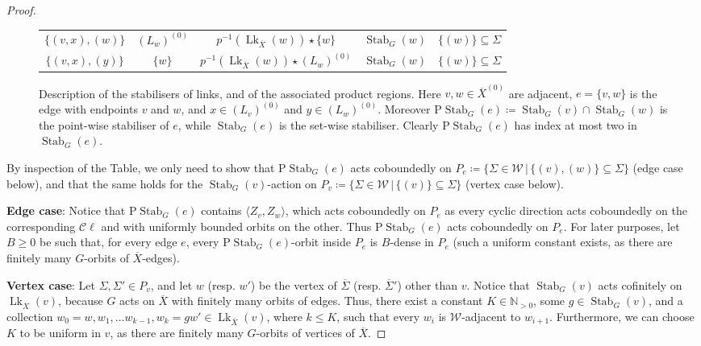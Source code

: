 \documentclass[svgnames]{amsart}
\theoremstyle{plain}
\theoremstyle{definition}
\newcommand{\C}{\mathcal C}
\newcommand{\ov}[1]{\overline{#1}}
\newcommand{\link}{\operatorname{Lk}}
\newcommand{\Stab}[2]{\operatorname{Stab}_{#1}(#2)}
\newcommand{\W}{\mathcal{W}}
\begin{document}
\begin{proof}
\begin{figure}[htp]
{\begin{tabular}{c|c|c|c|c}
        $\{(v,x),(w)\}$&  $(L_w)^{(0)}$ & $p^{-1}(\link_{\ov X}(w))\star \{w\}$ & $\Stab{G}{w}$ & $\{(w)\}\subseteq \Sigma $ \\
        $\{(v,x),(y)\}$&  $\{w\}$ & $p^{-1}(\link_{\ov X}(w))\star (L_w)^{(0)}$ &  $\Stab{G}{w}$ & $\{(w)\}\subseteq \Sigma $ 
    \end{tabular}}
    \caption{Description of the stabilisers of links, and of the associated product regions. Here $v,w\in\ov{X}^{(0)}$ are adjacent, $e=\{v,w\}$ is the edge with endpoints $v$ and $w$, and $x\in (L_v)^{(0)}$ and $y\in (L_w)^{(0)}$. Moreover $\text{P}\Stab{G}{e}\coloneq \Stab{G}{v}\cap\Stab{G}{w}$ is the point-wise stabiliser of $e$, while $\Stab{G}{e}$ is the set-wise stabiliser. Clearly $\text{P}\Stab{G}{e}$ has index at most two in $\Stab{G}{e}$.}
    \label{fig:stab_and_PR}
\end{figure}

By inspection of the Table, we only need to show that $\text{P}\Stab{G}{e}$ acts coboundedly on $P_e\coloneq\{\Sigma\in \W\,|\, \{(v), (w)\}\subseteq \Sigma\}$ (edge case below), and that 
the same holds for the $\Stab{G}{v}$-action on $P_v\coloneq\{\Sigma\in \W\,|\, \{(v)\}\subseteq \Sigma\}$ (vertex case below).

\par\medskip

\textbf{Edge case}:  Notice that $\text{P}\Stab{G}{e}$ contains $\langle Z_v, Z_w\rangle$, which acts coboundedly on $P_e$ as every cyclic direction acts coboundedly on the corresponding $\C\ell$ and with uniformly bounded orbits on the other. Thus $\text{P}\Stab{G}{e}$ acts coboundedly on $P_e$. For later purposes, let $B\ge 0$ be such that, for every edge $e$, every $\text{P}\Stab{G}{e}$-orbit inside $P_e$ is $B$-dense in $P_e$ (such a uniform constant exists, as there are finitely many $G$-orbits of $\ov X$-edges).

\par\medskip

\textbf{Vertex case}: Let $\Sigma, \Sigma'\in P_v$, and let $w$ (resp. $w'$) be the vertex of $\ov \Sigma$ (resp. $\ov \Sigma'$) other than $v$. Notice that $\Stab{G}{v}$ acts cofinitely on $\link_{\ov X}(v)$, because $G$ acts on $\ov X$ with finitely many orbits of edges. Thus, there exist a constant $K\in\mathbb{N}_{>0}$, some $g\in \Stab{G}{v}$, and a collection $w_0=w, w_1, \ldots w_{k-1}, w_k=g w'\in \link_{\ov X}(v)$, where $k\le K$, such that every $w_i$ is $\W$-adjacent to $w_{i+1}$. Furthermore, we can choose $K$ to be uniform in $v$, as there are finitely many $G$-orbits of vertices of $\ov X$.


\end{proof}
\end{document}
